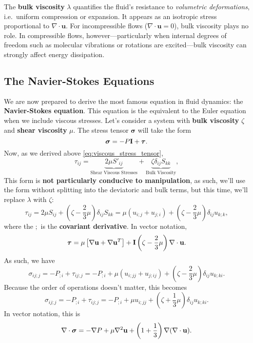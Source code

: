 \begin{definition}\label{def:bulk-viscosity}
The \textbf{bulk viscosity} $\lambda$ quantifies the fluid's resistance to \emph{volumetric deformations}, i.e.~uniform compression or expansion. It appears as an isotropic stress proportional to $\nabla \cdot \mathbf{u}$. For incompressible flows ($\nabla \cdot \mathbf{u} = 0$), bulk viscosity plays no role. In compressible flows, however—particularly when internal degrees of freedom such as molecular vibrations or rotations are excited—bulk viscosity can strongly affect energy dissipation.
\end{definition}


\subsection{The Navier-Stokes Equations}
We are now prepared to derive the most famous equation in fluid dynamics: the \textbf{Navier-Stokes equation}. This equation is the equivalent to the Euler equation when we include viscous stresses. Let's consider a system with \textbf{bulk viscosity} $\zeta$ and \textbf{shear viscosity} $\mu$. The stress tensor $\boldsymbol{\sigma}$ will take the form
\[
\boldsymbol{\sigma} = -P{\bf I} + \boldsymbol{\tau}.
\]
Now, as we derived above \eqref{eq:viscous_stress_tensor},
\[
    \tau_{ij} = \underbrace{2\mu S'_{ij}}_{\text{Shear Viscous Stresses}} + \underbrace{\zeta \delta_{ij} S_{kk}}_{\text{Bulk Viscosity}},
\]
This form is \textbf{not particularly conducive to manipulation}, as such, we'll use the form without splitting into the deviatoric and bulk terms, but this time, we'll replace $\lambda$ with $\zeta$:
\[
\tau_{ij} = 2\mu S_{ij} + \left(\zeta - \frac{2}{3}\mu\right) \delta_{ij} S_{kk} = \mu(u_{i;j} + u_{j;i}) + \left(\zeta-\frac{2}{3}\mu\right) \delta_{ij}u_{k;k},
\]
where the $;$ is the \textbf{covariant derivative}. In vector notation,
\[
\boldsymbol{\tau} = \mu\left[\nabla {\bf u} + \nabla{\bf u}^T\right] + {\bf I}\left(\zeta-\frac{2}{3}\mu\right)\nabla \cdot {\bf u}.
\]
As such, we have
\[
\sigma_{ij;j} = - P_{;i} + \tau_{ij;j} = -P_{;i} + \mu\left(u_{i;jj} + u_{j;ij}\right) + \left(\zeta - \frac{2}{3}\mu\right)\delta_{ij} u_{k;ki}.
\]
Because the order of operations doesn't matter, this becomes
\[
\sigma_{ij;j} = - P_{;i} + \tau_{ij;j} = -P_{;i} + \mu u_{i;jj} + \left(\zeta + \frac{1}{3}\mu\right)\delta_{ij} u_{k;ki}.
\]
In vector notation, this is
\[
\nabla \cdot \boldsymbol{\sigma} = -\nabla P + \mu \nabla^2 {\bf u} + \left(1+\frac{1}{3}\right)\nabla(\nabla \cdot {\bf u}).
\]
